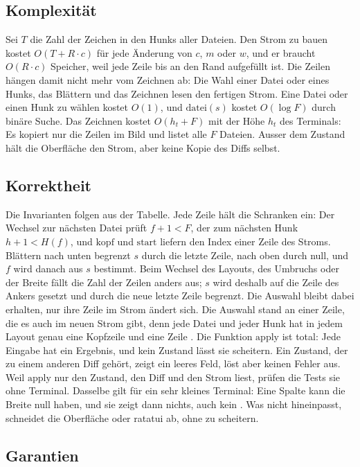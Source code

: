 \subsection{Komplexität}

Sei $T$ die Zahl der Zeichen in den Hunks aller Dateien. Den Strom zu bauen kostet
$O(T + R \cdot c)$ für jede Änderung von $c$, $m$ oder $w$, und er braucht $O(R \cdot c)$
Speicher, weil jede Zeile bis an den Rand aufgefüllt ist. Die Zeilen hängen damit nicht mehr vom
Zeichnen ab: Die Wahl einer Datei oder eines Hunks, das Blättern und das Zeichnen lesen den
fertigen Strom. Eine Datei oder einen Hunk zu wählen kostet $O(1)$, und
$\mathrm{datei}(s)$ kostet $O(\log F)$ durch binäre Suche. Das Zeichnen kostet $O(h_t + F)$ mit
der Höhe $h_t$ des Terminals: Es kopiert nur die Zeilen im Bild und listet alle $F$ Dateien.
Ausser dem Zustand hält die Oberfläche den Strom, aber keine Kopie des Diffs selbst.

\subsection{Korrektheit}

Die Invarianten folgen aus der Tabelle. Jede Zeile hält die Schranken ein: Der Wechsel zur
nächsten Datei prüft $f + 1 < F$, der zum nächsten Hunk $h + 1 < H(f)$,
und $\mathrm{kopf}$ und $\mathrm{start}$ liefern den Index einer Zeile des Stroms.
Blättern nach unten begrenzt $s$ durch die letzte Zeile, nach oben durch null, und $f$ wird
danach aus $s$ bestimmt. Beim Wechsel des Layouts, des Umbruchs oder der Breite fällt die Zahl der
Zeilen anders aus; $s$ wird deshalb auf die Zeile des Ankers gesetzt und durch die neue letzte
Zeile begrenzt. Die Auswahl bleibt dabei erhalten, nur ihre Zeile im Strom ändert sich. Die
Auswahl stand an einer Zeile, die es auch im neuen Strom gibt, denn jede Datei und jeder Hunk
hat in jedem Layout genau eine Kopfzeile und eine Zeile . Die Funktion $\mathrm{apply}$
ist total: Jede Eingabe hat ein Ergebnis, und kein Zustand lässt sie scheitern. Ein Zustand, der
zu einem anderen Diff gehört, zeigt ein leeres Feld, löst aber keinen Fehler aus. Weil
$\mathrm{apply}$ nur den Zustand, den Diff und den Strom liest, prüfen die Tests sie ohne Terminal.
Dasselbe gilt für ein sehr kleines Terminal: Eine Spalte kann die Breite null haben, und sie
zeigt dann nichts, auch kein . Was nicht hineinpasst, schneidet die Oberfläche oder
ratatui ab, ohne zu scheitern.

\subsection{Garantien}

